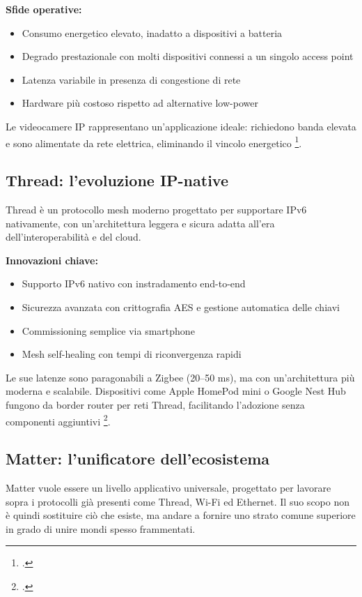 \textbf{Sfide operative:}
\begin{itemize}
    \item Consumo energetico elevato, inadatto a dispositivi a batteria
    \item Degrado prestazionale con molti dispositivi connessi a un singolo access point
    \item Latenza variabile in presenza di congestione di rete
    \item Hardware più costoso rispetto ad alternative low-power
\end{itemize}

Le videocamere IP rappresentano un'applicazione ideale: richiedono banda elevata e sono alimentate da rete elettrica, eliminando il vincolo energetico \footcite{WiFiVsIoT}.

\subsection{Thread: l'evoluzione IP-native}

Thread è un protocollo mesh moderno progettato per supportare IPv6 nativamente, con un’architettura leggera e sicura adatta all’era dell’interoperabilità e del cloud.

\textbf{Innovazioni chiave:}
\begin{itemize}
    \item Supporto IPv6 nativo con instradamento end-to-end
    \item Sicurezza avanzata con crittografia AES e gestione automatica delle chiavi
    \item Commissioning semplice via smartphone
    \item Mesh self-healing con tempi di riconvergenza rapidi
\end{itemize}

Le sue latenze sono paragonabili a Zigbee (20–50 ms), ma con un’architettura più moderna e scalabile. Dispositivi come Apple HomePod mini o Google Nest Hub fungono da border router per reti Thread, facilitando l’adozione senza componenti aggiuntivi \footcite{thread-spec}.

\subsection{Matter: l’unificatore dell’ecosistema}

Matter vuole essere un livello applicativo universale, progettato per lavorare sopra i protocolli già presenti come Thread, Wi-Fi ed Ethernet. Il suo scopo non è quindi sostituire ciò che esiste, ma andare a fornire uno strato comune superiore in grado di unire mondi spesso frammentati. 


